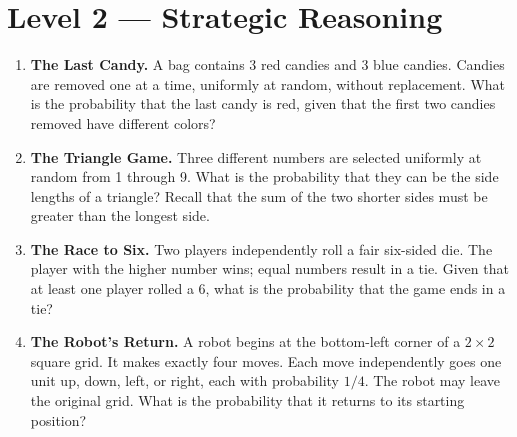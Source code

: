 \section*{Level 2 --- Strategic Reasoning}
\begin{enumerate}[label=\textbf{\arabic*.},start=5]
\item \textbf{The Last Candy.} A bag contains 3 red candies and 3 blue candies. Candies are removed one at a time, uniformly at random, without replacement. What is the probability that the last candy is red, given that the first two candies removed have different colors?

\item \textbf{The Triangle Game.} Three different numbers are selected uniformly at random from 1 through 9. What is the probability that they can be the side lengths of a triangle? Recall that the sum of the two shorter sides must be greater than the longest side.

\item \textbf{The Race to Six.} Two players independently roll a fair six-sided die. The player with the higher number wins; equal numbers result in a tie. Given that at least one player rolled a 6, what is the probability that the game ends in a tie?

\item \textbf{The Robot's Return.} A robot begins at the bottom-left corner of a $2\times2$ square grid. It makes exactly four moves. Each move independently goes one unit up, down, left, or right, each with probability $1/4$. The robot may leave the original grid. What is the probability that it returns to its starting position?
\end{enumerate}

